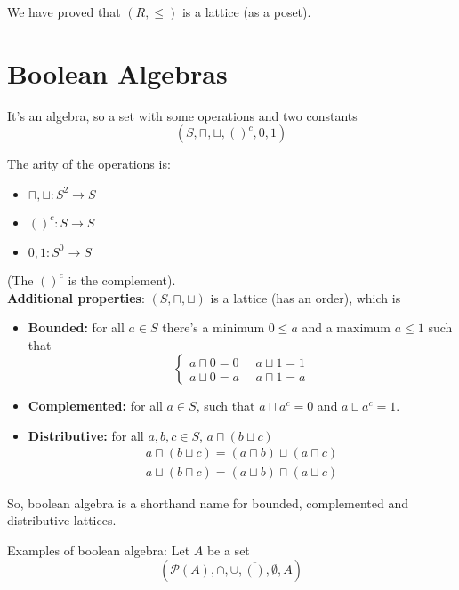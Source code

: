 	We have proved that $(R, \leq)$ is a lattice (as a poset).\\

	\newpage

	\section{Boolean Algebras}

	It's an algebra, so a set with some operations and two constants
	$$ (S, \sqcap, \sqcup, ()^c, 0, 1 ) $$

	The arity of the operations is:
	\begin{itemize}
		\item $\sqcap, \sqcup : S^2 \rightarrow S$
		\item $()^c: S \rightarrow S$
		\item $0,1: S^0 \rightarrow S$
	\end{itemize}
	(The $()^c$ is the complement).\\

	\textbf{Additional properties}: $(S, \sqcap, \sqcup)$ is a lattice (has an order), which is
	\begin{itemize}
		\item \textbf{Bounded:} for all $a \in S$ there's a minimum $0 \leq a$ and a maximum $a \leq 1$ such that
		$$ \begin{cases}
			a \sqcap 0 = 0 \;\; &  a \sqcup 1  = 1 \\
			a \sqcup 0 = a & a \sqcap 1 = a
		\end{cases}$$
		\nn

		\item \textbf{Complemented:} for all $a \in S$, such that $a \sqcap a^c = 0$ and $a \sqcup a^c = 1$.\\

		\item \textbf{Distributive:} for all $a,b,c \in S$, $a \sqcap (b \sqcup c)$
		$$ \begin{array}{c}
			a \sqcap (b \sqcup c) = (a \sqcap b) \sqcup (a \sqcap c) \\
			a \sqcup (b \sqcap c) = (a \sqcup b) \sqcap (a \sqcup c)
		\end{array}$$
		\nn
	\end{itemize}

	So, boolean algebra is a shorthand name for bounded, complemented and distributive lattices.\\

	\newpage

	Examples of boolean algebra: Let $A$ be a set
	$$ (\mathcal{P}(A), \cap, \cup, \overline{()}, \emptyset, A) $$

